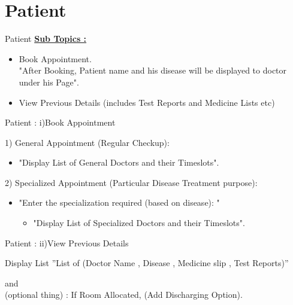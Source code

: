 \documentclass{beamer}
\begin{document}
\section{Patient}
\begin{frame}{Patient}
\underline{\textbf{Sub Topics :}}
\begin{itemize}
\item Book Appointment.\\
"After Booking, Patient name and his disease will be displayed to doctor under his Page".
\item View Previous Details (includes Test Reports and Medicine Lists etc)
\end{itemize}
\end{frame}
%
\begin{frame}{Patient : i)Book Appointment}
\begin{block}{1) General Appointment (Regular Checkup):}
\begin{itemize}
\item "Display List of General Doctors and their Timeslots".
\end{itemize}
\end{block}
\begin{block}{2) Specialized Appointment (Particular Disease Treatment purpose):}
\begin{itemize}
\item "Enter the specialization required (based on disease): "
\begin{itemize}
\item "Display List of Specialized Doctors and their Timeslots".
\end{itemize}
\end{itemize}
\end{block}
\end{frame}
%
\begin{frame} {Patient : ii)View Previous Details}
\begin{exampleblock}{Display List}
 ”List of (Doctor Name , Disease , Medicine slip , Test Reports)”
\end{exampleblock}
and \\[40pt]
(optional thing) : If Room Allocated, (Add Discharging Option).
\end{frame}
%
\end{document}
